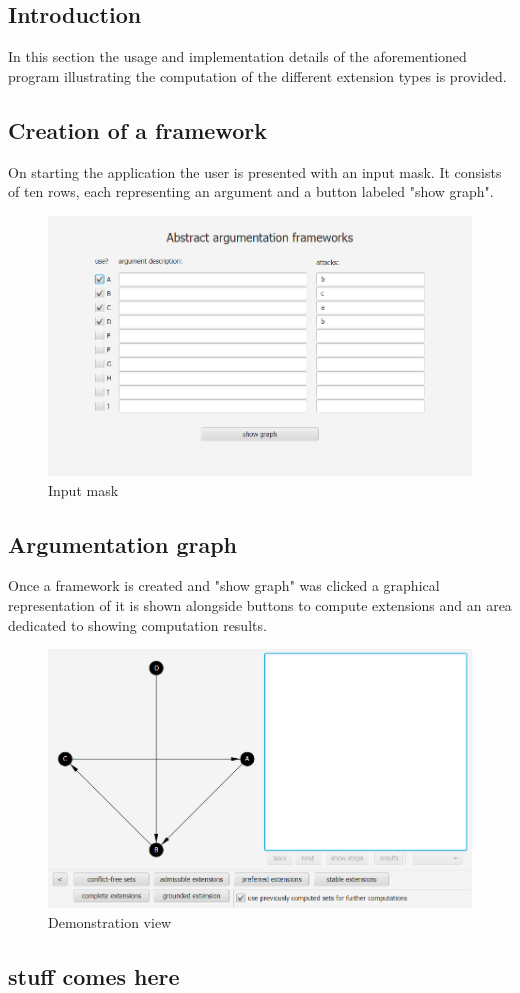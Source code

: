 \documentclass{article}
\begin{document}
\subsection{Introduction}
In this section the usage and implementation details of the aforementioned program illustrating the computation of the different extension types is provided.

\subsection{Creation of a framework}
On starting the application the user is presented with an input mask. It consists of ten rows, each representing an argument and a button labeled "show graph".

\FloatBarrier
	\begin{figure}[!htb]
		\includegraphics[width=\linewidth]{pics/input.png}
		\caption{Input mask}
	\end{figure}
\FloatBarrier

\subsection{Argumentation graph}
Once a framework is created and "show graph" was clicked a graphical representation of it is shown alongside buttons to compute extensions and an area dedicated to showing computation results.

\FloatBarrier
	\begin{figure}[!htb]
		\includegraphics[width=\linewidth]{pics/demo.png}
		\caption{Demonstration view}
	\end{figure}
\FloatBarrier

\subsection{stuff comes here}
\end{document}
